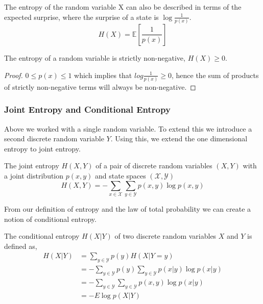 \begin{remark}[Suprise]
	The entropy of the random variable X can also be described in terms of the expected surprise, where the surprise of a state is $\log \frac{1}{p(x)}$.
	\begin{equation}
		H(X) = \mathbb{E} \left[ \frac{1}{p(x)} \right]
	\end{equation}
\end{remark}	





\begin{lemma}
	The entropy of a random variable is strictly non-negative, $H(X) \geq 0$.
\end{lemma}

\begin{proof}
	$0 \leq p(x) \leq 1$ which implies that $log \frac{1}{p(x)} \geq 0$,
	hence the sum of products of strictly non-negative terms will always be non-negative. 
\end{proof}


\subsubsection{Joint Entropy and Conditional Entropy}

Above we worked with a single random variable. To extend this we introduce a second discrete random variable $Y$. Using this, we extend the one dimensional entropy to joint entropy. 

\begin{definition}
	The joint entropy $H(X,Y)$ of a pair of discrete random variables $(X,Y)$ with a joint distribution $p(x,y)$ and state spaces $(\mathcal{X}, \mathcal{Y})$
	\begin{equation}\label{eq:jointentropy}
	H(X, Y)=-\sum_{x \in \mathcal{X}} \sum_{y \in \mathcal{Y}} p(x, y) \log p(x, y)
	\end{equation}
\end{definition}

From our definition of entropy and the law of total probability we can create a notion of conditional entropy.

\begin{definition}
	The conditional entropy $H(X|Y)$ of two discrete random variables $X$ and $Y$ is defined as, 
		\begin{align}
		H(X | Y)&=\sum_{y \in \mathcal{Y}} p(y) H(X |Y=y) \\
		&=-\sum_{y \in \mathcal{Y}} p(y) \sum_{y \in \mathcal{Y}} p(x | y) \log p(x | y) \\ 
		&=-\sum_{y \in \mathcal{Y}} \sum_{y \in \mathcal{Y}} p(x, y) \log p(x | y) \\ 
		&=-E \log p(X | Y)
		\end{align}
\end{definition}


